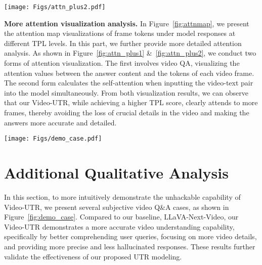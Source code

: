 \begin{figure*}[t!]
\centering
\texttt{[image: Figs/attn\_plus2.pdf]}
\caption{\textbf{Video-text input attention visualization.} The left is the attention map of the model with low TPL while the right is the attention map with high TPL score.}
\label{fig:attn_plus2}
\vspace{-4mm}
\end{figure*}

\textbf{More attention visualization analysis.} In Figure~\ref{fig:attnmap}, we present the attention map visualizations of frame tokens under model responses at different TPL levels. In this part, we further provide more detailed attention analysis. As shown in Figure~\ref{fig:attn_plus1} \&~\ref{fig:attn_plus2}, we conduct two forms of attention visualization. The first involves video QA, visualizing the attention values between the answer content and the tokens of each video frame. The second form calculates the self-attention when inputting the video-text pair into the model simultaneously. From both visualization results, we can observe that our Video-UTR, while achieving a higher TPL score, clearly attends to more frames, thereby avoiding the loss of crucial details in the video and making the answers more accurate and detailed.

\begin{figure*}[t!]
\centering
\texttt{[image: Figs/demo\_case.pdf]}
\caption{\textbf{Qualitative examples visualization} of Video-UTR. Please note that we only display the most important frames from the full video (32 frames) to conserve space.}
\label{fig:demo_case}
\end{figure*}



\section{Additional Qualitative Analysis}
\label{more_cases}

In this section, to more intuitively demonstrate the unhackable capability of Video-UTR, we present several subjective video Q\&A cases, as shown in Figure~\ref{fig:demo_case}. Compared to our baseline, LLaVA-Next-Video, our Video-UTR demonstrates a more accurate video understanding capability, specifically by better comprehending user queries, focusing on more video details, and providing more precise and less hallucinated responses. These results further validate the effectiveness of our proposed UTR modeling.


